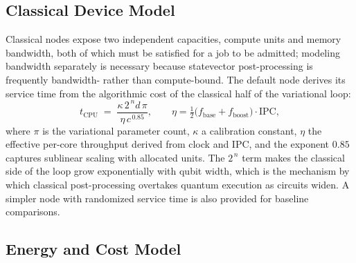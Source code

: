 \subsection{Classical Device Model}
\label{sec:arch-cpu}

Classical nodes expose two independent capacities, compute units and memory
bandwidth, both of which must be satisfied for a job to be admitted; modeling
bandwidth separately is necessary because statevector post-processing is
frequently bandwidth- rather than compute-bound. The default node derives its
service time from the algorithmic cost of the classical half of the
variational loop:
\begin{equation}
\label{eq:cpu-time}
t_{\mathrm{CPU}} \;=\; \frac{\kappa\, 2^{\,n} d\, \pi}{\eta\, c^{\,0.85}},
\qquad
\eta = \tfrac{1}{2}\bigl(f_{\mathrm{base}} + f_{\mathrm{boost}}\bigr)\cdot\mathrm{IPC},
\end{equation}
where $\pi$ is the variational parameter count, $\kappa$ a calibration
constant, $\eta$ the effective per-core throughput derived from clock and IPC,
and the exponent $0.85$ captures sublinear scaling with allocated units. The
$2^{\,n}$ term makes the classical side of the loop grow exponentially with
qubit width, which is the mechanism by which classical post-processing
overtakes quantum execution as circuits widen. A simpler node with randomized
service time is also provided for baseline comparisons.

\subsection{Energy and Cost Model}
\label{sec:arch-energy}

